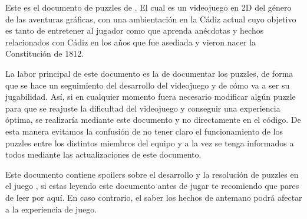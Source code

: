 Este es el documento de puzzles de \nombrejuego. El cual es un videojuego en 2D del género de las aventuras gráficas, con una ambientación en la Cádiz actual cuyo objetivo es tanto de entretener al jugador como que aprenda anécdotas y hechos relacionados con Cádiz en los años que fue asediada y vieron nacer la Constitución de 1812.

La labor principal de este documento es la de documentar los puzzles, de forma que se hace un seguimiento del desarrollo del videojuego y de cómo va a ser su jugabilidad. Así, si en cualquier momento fuera necesario modificar algún puzzle para que se reajuste la dificultad del videojuego y conseguir una experiencia óptima, se realizaría mediante este documento y no directamente en el código. De esta manera evitamos la confusión de no tener claro el funcionamiento de los puzzles entre los distintos miembros del equipo y a la vez se tenga informados a todos mediante las actualizaciones de este documento.

{\color{rojo}Este documento contiene spoilers sobre el desarrollo y la resolución de puzzles en el juego \nombrejuego, si estas leyendo este documento antes de jugar te recomiendo que pares de leer por aquí. En caso contrario, el saber los hechos de antemano podrá afectar a la experiencia de juego.} 
